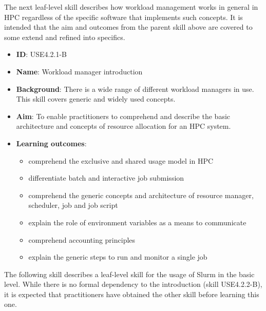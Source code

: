 \documentclass[jocse]{jocseart}
\newcommand{\kh}[1]{\todo[inline]{KH: #1}}
\begin{document}
The next leaf-level skill describes how workload management works in general in HPC regardless of the specific software that implements such concepts.
It is intended that the aim and outcomes from the parent skill above are covered to some extend and refined into specifics.


\begin{itemize}
  \item \textbf{ID}: USE4.2.1-B
  \item \textbf{Name}: Workload manager introduction
  \item \textbf{Background}: There is a wide range of different workload managers in use. This skill covers generic and widely used concepts.
  \item \textbf{Aim}: To enable practitioners to comprehend and describe the basic architecture and concepts of resource allocation for an HPC system.
  \item \textbf{Learning outcomes}:

  \begin{itemize}
  \item comprehend the exclusive and shared usage model in HPC
  \item differentiate batch and interactive job submission
  \item comprehend the generic concepts and architecture of resource manager, scheduler, job and job script
  \item explain the role of environment variables as a means to communicate
  \item comprehend accounting principles
  \item explain the generic steps to run and monitor a single job
  \end{itemize}
\end{itemize}


The following skill describes a leaf-level skill for the usage of Slurm in\kh{at} the basic level.
While there is no formal dependency to the introduction (skill USE4.2.2-B), it is expected that practitioners have obtained the other skill before learning this one.
\end{document}
